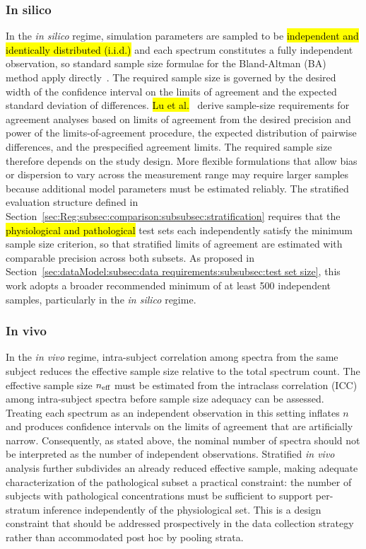 \subsubsection{In silico}
In the \textit{in silico} regime, simulation parameters are sampled to be \hl{independent and identically distributed (i.i.d.)} and each spectrum constitutes a fully independent observation, so standard sample size formulae for the Bland-Altman (BA) method apply directly~\cite{Lu2016}. The required sample size is governed by the desired width of the confidence interval on the limits of agreement and the expected standard deviation of differences. \hl{Lu et al.}~\cite{Lu2016} derive sample-size requirements for agreement analyses based on limits of agreement from the desired precision and power of the limits-of-agreement procedure, the expected distribution of pairwise differences, and the prespecified agreement limits. The required sample size therefore depends on the study design. More flexible formulations that allow bias or dispersion to vary across the measurement range may require larger samples because additional model parameters must be estimated reliably. The stratified evaluation structure defined in Section~\ref{sec:Reg:subsec:comparison:subsubsec:stratification} requires that the \hl{physiological and pathological} test sets each independently satisfy the minimum sample size criterion, so that stratified limits of agreement are estimated with comparable precision across both subsets. As proposed in Section~\ref{sec:dataModel:subsec:data requirements:subsubsec:test set size}, this work adopts a broader recommended minimum of at least 500 independent samples, particularly in the \textit{in silico} regime. 

\subsubsection{In vivo}
In the \textit{in vivo} regime, intra-subject correlation among spectra from the same subject reduces the effective sample size relative to the total spectrum count. The effective sample size $n_\textnormal{eff}$ must be estimated from the intraclass correlation (ICC) among intra-subject spectra before sample size adequacy can be assessed. Treating each spectrum as an independent observation in this setting inflates $n$ and produces confidence intervals on the limits of agreement that are artificially narrow. Consequently, as stated above, the nominal number of spectra should not be interpreted as the number of independent observations. Stratified \textit{in vivo} analysis further subdivides an already reduced effective sample, making adequate characterization of the pathological subset a practical constraint: the number of subjects with pathological concentrations must be sufficient to support per-stratum inference independently of the physiological set. This is a design constraint that should be addressed prospectively in the data collection strategy rather than accommodated post hoc by pooling strata.

